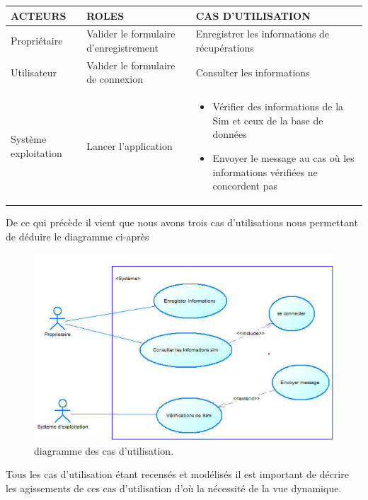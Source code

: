 \documentclass[a4paper, 12pt]{article}
\begin{document}
\begin{tabular}{|p{3.5cm}|p{3.5cm}|p{3.5cm}|}
\hline
\centering ACTEURS & \centering ROLES & \centering CAS D'UTILISATION 
\tabularnewline
\hline
\raggedright Propriétaire & Valider le formulaire d’enregistrement & \raggedright Enregistrer les informations de récupérations 
\tabularnewline
\hline
\raggedright Utilisateur & Valider le formulaire de connexion & Consulter les informations \tabularnewline 
\hline
\centering Système exploitation &\centering Lancer l’application & \begin{itemize} \item Vérifier des informations de la Sim et ceux de la base de données\end{itemize} \begin{itemize}
\item Envoyer le message au cas où les informations vérifiées ne concordent pas 
\end{itemize} \tabularnewline
\hline
\end{tabular}

De ce qui précède il vient que nous avons trois cas d’utilisations nous permettant de déduire le diagramme ci-après
\begin{figure}[h]
\begin{center}
\includegraphics[scale=0.5]{images4.png}
\end{center}
\caption{diagramme des cas d’utilisation.}
\end{figure}


Tous les cas d’utilisation étant recensés et modélisés il est important de décrire les agissements de ces cas d’utilisation d’où la nécessité de la vue dynamique.
\end{document}
